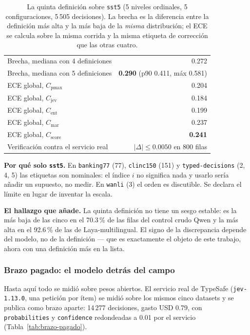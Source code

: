 \begin{table}[t]
\centering
\caption{La quinta definición sobre \texttt{sst5} (5 niveles ordinales, 5 configuraciones, 5\,505 decisiones).
La brecha es la diferencia entre la definición más alta y la más baja de la \emph{misma} distribución; el ECE se
calcula sobre la misma corrida y la misma etiqueta de corrección que las otras cuatro.}
\label{tab:extension-score}
{\footnotesize
\begin{tabular}{@{}lr@{}}
\toprule
Brecha, mediana con 4 definiciones & 0.272 \\
Brecha, mediana con 5 definiciones & \textbf{0.290} (p90 0.411, máx 0.581) \\
\midrule
ECE global, $C_{\text{pmax}}$ & 0.204 \\
ECE global, $C_{\text{jev}}$ & 0.184 \\
ECE global, $C_{\text{ent}}$ & 0.199 \\
ECE global, $C_{\text{mar}}$ & 0.237 \\
ECE global, $C_{\text{score}}$ & \textbf{0.241} \\
\midrule
Verificación contra el servicio real & $\lvert\Delta\rvert \le 0.0050$ en 800 filas \\
\bottomrule
\end{tabular}}
\end{table}

\textbf{Por qué solo \texttt{sst5}.} En \texttt{banking77} (77), \texttt{clinc150} (151) y
\texttt{typed-decisions} (2, 4, 5) las etiquetas son nominales: el índice $i$ no significa nada y usarlo sería
añadir un supuesto, no medir. En \texttt{wanli} (3) el orden es discutible. Se declara el límite en lugar de
inventar la escala.

\textbf{El hallazgo que añade.} La quinta definición no tiene un sesgo estable: es la más baja de las
cinco en el 70.3\,\% de las filas del control crudo Qwen y la más alta en el 92.6\,\% de las de
Laya-multilingual. El signo de la discrepancia depende del modelo, no de la definición --- que es exactamente el
objeto de este trabajo, ahora con una definición más en la lista.

\subsubsection{Brazo pagado: el modelo detrás del campo}

Hasta aquí todo se midió sobre pesos abiertos. El servicio real de TypeSafe (\texttt{jev-1.13.0}, una petición
por ítem) se midió sobre los mismos cinco datasets y se publica como brazo aparte: 14\,277 decisiones,
gasto USD 0.79, con \texttt{probabilities} y \texttt{confidence} redondeadas a 0.01 por el
servicio (Tabla~\ref{tab:brazo-pagado}).

